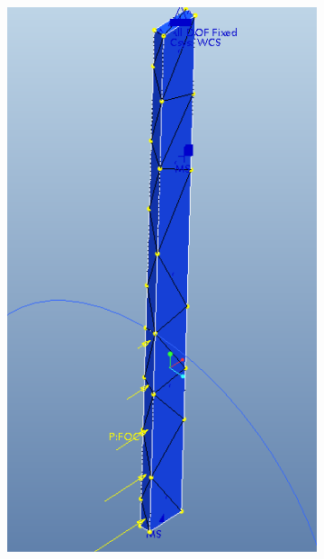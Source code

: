 \documentclass[12pt,letterpaper]{report}
\begin{document}
		\graphicspath{ {./ScreenShots/Meshes/} }
		\begin{figure}[H]
			\centering
			\begin{subfigure}{.3\textwidth}
				\includegraphics[width=\textwidth]{CenterMeshCrop}
				\label{fig:CenterMesh}
			\end{subfigure}
			\begin{subfigure}{.3\textwidth}

\end{subfigure}
\end{figure}
\end{document}
